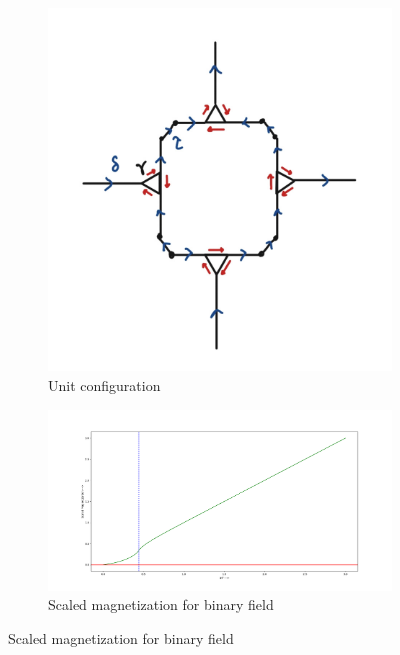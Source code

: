 \documentclass{article}
\begin{document}
	\begin{figure}[h]
		\centering
		\begin{subfigure}[b]{0.3\textwidth}
			\includegraphics[width=\textwidth]{Square.jpg}
			\caption{Unit configuration}
			\label{fig:img1}
		\end{subfigure}
		\hfill
		\begin{subfigure}[b]{0.5\textwidth}
			\includegraphics[width=\textwidth]{Scaled Magnetization.png}
			\caption{Scaled magnetization for binary field}
			\label{fig:img2}
		\end{subfigure}
	\end{figure}
	 
\end{document}
